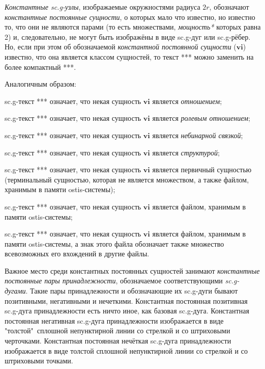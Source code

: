 \begin{SCn}
{\textit{Константные sc.g-узлы}, изображаемые окружностями радиуса $2r$, обозначают \textit{константные постоянные сущности}, о которых мало что известно, но известно то, что они не являются парами (то есть множествами, \textit{мощность*} которых равна 2) и, следовательно, не могут быть изображёны в виде sc.g-дуг или sc.g-рёбер. Но, если при этом об обозначаемой \textit{константной постоянной сущности} ($\bm{vi}$) известно, что она является классом сущностей, то текст *** можно заменить на более компактный ***. 

Аналогичным образом: 
\begin{scnitemize}
\item sc.g-текст *** означает, что некая сущность $\bm{vi}$ является \textit{отношением}; 
\item sc.g-текст *** означает, что некая сущность $\bm{vi}$ является \textit{ролевым отношением}; 
\item sc.g-текст *** означает, что некая сущность $\bm{vi}$ является \textit{небинарной связкой}; 
\item sc.g-текст *** означает, что некая сущность $\bm{vi}$ является \textit{структурой}; 
\item sc.g-текст *** означает, что некая сущность $\bm{vi}$ является первичный сущностью (терминальный сущностью, которая не является множеством, а также файлом, хранимым в памяти ostis-системы); 
\item sc.g-текст *** означает, что некая сущность $\bm{vi}$ является файлом, хранимым в памяти ostis-системы;
\item sc.g-текст *** означает, что некая сущность $\bm{vi}$ является файлом, хранимым в памяти ostis-системы, а знак этого файла обозначает также множество всевозможных его вхождений в другие файлы. 
\end{scnitemize}

Важное место среди константных постоянных сущностей занимают \textit{константные постоянные пары принадлежности}, обозначаемое соответствующими \textit{sc.g-дугами}. Такие пары принадлежности и обозначающие их sc.g-дуги бывают позитивными, негативными и нечеткими. Константная постоянная позитивная sc.g-дуга принадлежности есть ничто иное, как базовая sc.g-дуга. Константная постоянная негативная sc.g-дуга принадлежности изображается в виде "толстой"\ сплошной непунктирной линии со стрелкой и со штриховыми черточками. Константная постоянная нечёткая sc.g-дуга принадлежности изображается в виде толстой сплошной непунктирной линии со стрелкой и со штриховыми точками.}


\end{SCn}

